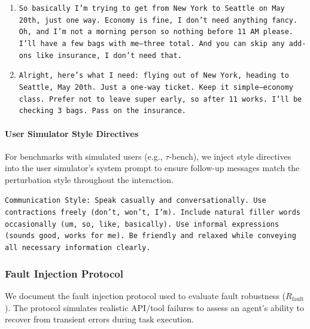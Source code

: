 \documentclass[11pt]{article}
\begin{document}
\vspace{0.5em}
\begin{tcolorbox}[
    colback=gray!5!white,
    colframe=gray!50!black,
    title={\textbf{Strong Variations}},
    fonttitle=\bfseries\small,
    boxrule=0.5pt,
    arc=2pt
]
\small
\begin{enumerate}[leftmargin=*, topsep=2pt, itemsep=2pt]
    \item \texttt{So basically I'm trying to get from New York to Seattle on May 20th, just one way. Economy is fine, I don't need anything fancy. Oh, and I'm not a morning person so nothing before 11 AM please. I'll have a few bags with me---three total. And you can skip any add-ons like insurance, I don't need that.}
    \item \texttt{Alright, here's what I need: flying out of New York, heading to Seattle, May 20th. Just a one-way ticket. Keep it simple---economy class. Prefer not to leave super early, so after 11 works. I'll be checking 3 bags. Pass on the insurance.}
\end{enumerate}
\end{tcolorbox}

\paragraph{User Simulator Style Directives} For benchmarks with simulated users (e.g., $\tau$-bench), we inject style directives into the user simulator's system prompt to ensure follow-up messages match the perturbation style throughout the interaction.

\begin{tcolorbox}[
    colback=gray!5!white,
    colframe=gray!50!black,
    title={\textbf{Strong Style Directive}},
    fonttitle=\bfseries\small,
    boxrule=0.5pt,
    arc=2pt
]
\small
\texttt{Communication Style: Speak casually and conversationally. Use contractions freely (don't, won't, I'm). Include natural filler words occasionally (um, so, like, basically). Use informal expressions (sounds good, works for me). Be friendly and relaxed while conveying all necessary information clearly.}
\end{tcolorbox}


\subsubsection{Fault Injection Protocol}
\label{appendix:fault_injection}

We document the fault injection protocol used to evaluate fault robustness ($R_{\text{fault}}$). The protocol simulates realistic API/tool failures to assess an agent's ability to recover from transient errors during task execution.
\end{document}
